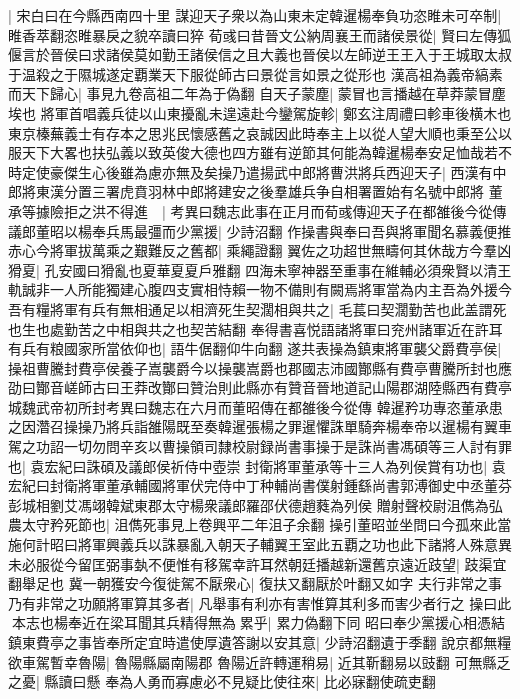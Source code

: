 |{
	宋白曰在今縣西南四十里}
謀迎天子衆以為山東未定韓暹楊奉負功恣睢未可卒制|{
	睢香萃翻恣睢暴戾之貌卒讀曰猝}
荀彧曰昔晉文公納周襄王而諸侯景從|{
	賢曰左傳狐偃言於晉侯曰求諸侯莫如勤王諸侯信之且大義也晉侯以左師逆王王入于王城取太叔于温殺之于隰城遂定覇業天下服從師古曰景從言如景之從形也}
漢高祖為義帝縞素而天下歸心|{
	事見九卷高祖二年為于偽翻}
自天子蒙塵|{
	蒙冒也言播越在草莽蒙冒塵埃也}
將軍首唱義兵徒以山東擾亂未遑遠赴今鑾駕旋軫|{
	鄭玄注周禮曰軫車後横木也}
東京榛蕪義士有存本之思兆民懷感舊之哀誠因此時奉主上以從人望大順也秉至公以服天下大畧也扶弘義以致英俊大德也四方雖有逆節其何能為韓暹楊奉安足恤哉若不時定使豪傑生心後雖為慮亦無及矣操乃遣揚武中郎將曹洪將兵西迎天子|{
	西漢有中郎將東漢分置三署虎賁羽林中郎將建安之後羣雄兵争自相署置始有名號中郎將}
董承等據險拒之洪不得進　|{
	考異曰魏志此事在正月而荀彧傳迎天子在都雒後今從傳}
議郎董昭以楊奉兵馬最彊而少黨援|{
	少詩沼翻}
作操書與奉曰吾與將軍聞名慕義便推赤心今將軍拔萬乘之艱難反之舊都|{
	乘繩證翻}
翼佐之功超世無疇何其休哉方今羣凶猾夏|{
	孔安國曰猾亂也夏華夏夏戶雅翻}
四海未寧神器至重事在維輔必須衆賢以清王軌誠非一人所能獨建心腹四支實相恃賴一物不備則有闕焉將軍當為内主吾為外援今吾有糧將軍有兵有無相通足以相濟死生契濶相與共之|{
	毛萇曰契濶勤苦也此盖謂死也生也處勤苦之中相與共之也契苦結翻}
奉得書喜悦語諸將軍曰兖州諸軍近在許耳有兵有粮國家所當依仰也|{
	語牛倨翻仰牛向翻}
遂共表操為鎮東將軍襲父爵費亭侯|{
	操祖曹騰封費亭侯養子嵩襲爵今以操襲嵩爵也郡國志沛國酇縣有費亭曹騰所封也應劭曰酇音嵯師古曰王莽改酇曰贊治則此縣亦有贊音晉地道記山陽郡湖陸縣西有費亭城魏武帝初所封考異曰魏志在六月而董昭傳在都雒後今從傳}
韓暹矜功專恣董承患之因濳召操操乃將兵詣雒陽既至奏韓暹張楊之罪暹懼誅單騎奔楊奉帝以暹楊有翼車駕之功詔一切勿問辛亥以曹操領司隸校尉録尚書事操于是誅尚書馮碩等三人討有罪也|{
	袁宏紀曰誅碩及議郎侯祈侍中壺崇}
封衛將軍董承等十三人為列侯賞有功也|{
	袁宏紀曰封衛將軍董承輔國將軍伏完侍中丁种輔尚書僕射鍾繇尚書郭溥御史中丞董芬彭城相劉艾馮翊韓斌東郡太守楊衆議郎羅邵伏德趙蕤為列侯}
贈射聲校尉沮儁為弘農太守矜死節也|{
	沮儁死事見上卷興平二年沮子余翻}
操引董昭並坐問曰今孤來此當施何計昭曰將軍興義兵以誅暴亂入朝天子輔翼王室此五覇之功也此下諸將人殊意異未必服從今留匡弼事埶不便惟有移駕幸許耳然朝廷播越新還舊京遠近跂望|{
	跂渠宜翻舉足也}
冀一朝獲安今復徙駕不厭衆心|{
	復扶又翻厭於叶翻又如字}
夫行非常之事乃有非常之功願將軍算其多者|{
	凡舉事有利亦有害惟算其利多而害少者行之}
操曰此本志也楊奉近在梁耳聞其兵精得無為累乎|{
	累力偽翻下同}
昭曰奉少黨援心相憑結鎮東費亭之事皆奉所定宜時遣使厚遺答謝以安其意|{
	少詩沼翻遺于季翻}
說京都無糧欲車駕暫幸魯陽|{
	魯陽縣屬南陽郡}
魯陽近許轉運稍易|{
	近其靳翻易以豉翻}
可無縣乏之憂|{
	縣讀曰懸}
奉為人勇而寡慮必不見疑比使往來|{
	比必寐翻使疏吏翻}
